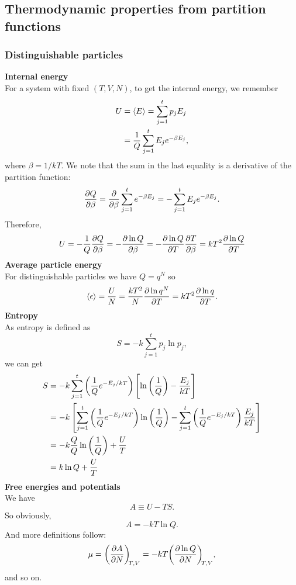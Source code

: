 \subsection{Thermodynamic properties from partition functions}
\subsubsection{Distinguishable particles}
\textbf{Internal energy}\\
For a system with fixed $(T,V,N)$, to get the internal energy, we remember
\begin{subequations}
\begin{align}
U&=\langle E\rangle=\sum^{t}_{j=1} p_jE_j\\
&=\frac{1}{Q}\sum^{t}_{j=1} E_je^{-\beta E_j},
\end{align}
\end{subequations}
where $\beta=1/kT$. We note that the sum in the last equality is a derivative of the partition function:
\begin{equation}
\diffp Q\beta=\diffp*{\sum^{t}_{j=1} e^{-\beta E_j}}\beta=-\sum^{t}_{j=1} E_je^{-\beta E_j}.
\end{equation}
Therefore, 
\begin{equation}
U=-\frac{1}{Q}\diffp Q\beta=-\diffp{\ln Q}{\beta}=-\diffp{\ln Q}{T}\diffp{T}{\beta}=kT^2\diffp{\ln Q}{T}
\end{equation}
\textbf{Average particle energy}\\
For distinguishable particles we have $Q=q^N$ so
\begin{equation}
\lgl \epsilon\rgl=\frac{U}{N}=\frac{kT^2}{N}\diffp{\ln q^N}{T}=kT^2\diffp{\ln q}{T}.
\end{equation}
\textbf{Entropy}\\
As entropy is defined as 
\begin{equation}
S=-k \sum^{t}_{j=1} p_j\ln p_j,
\end{equation}
we can get 
\begin{subequations}
\begin{align}
S&=-k \sum^{t}_{j=1} \left(\frac{1}{Q}e^{-E_j/kT} \right)\left[\ln\left(\frac{1}{Q}\right)-\frac{E_j}{kT} \right]\\
&=-k\left[ \sum^{t}_{j=1} \left(\frac{1}{Q}e^{-E_j/kT} \right)\ln\left(\frac{1}{Q}\right)-\sum^{t}_{j=1} \left(\frac{1}{Q}e^{-E_j/kT} \right)\frac{E_j}{kT} \right]\\
&=-k\frac{Q}{Q}\ln\left(\frac{1}{Q}\right)+\frac{U}{T}\\
&=k\ln Q+\frac{U}{T}
\end{align}
\end{subequations}
\textbf{Free energies and potentials}\\
We have
\begin{equation}
A\equiv U-TS. 
\end{equation}
So obviously,
\begin{equation}
A=-kT\ln Q.
\end{equation}
And more definitions follow:
\begin{equation}
\mu=\diffp AN[T,V]=-kT\diffp{\ln Q}{N}[T,V],
\end{equation}
and so on.

